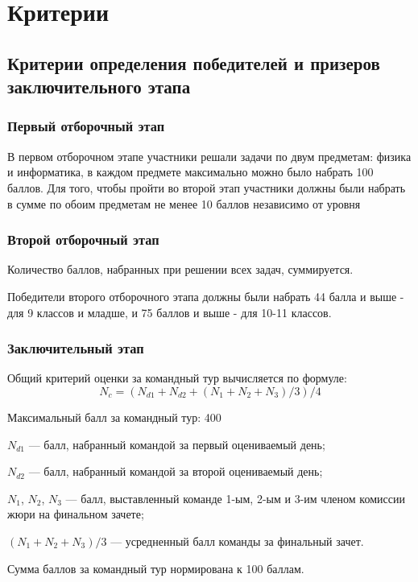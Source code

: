 \part{Критерии}

\chapter{Критерии определения победителей и призеров заключительного этапа}

\section{Первый отборочный этап}

В первом отборочном этапе участники решали задачи по двум предметам: физика и информатика, в каждом предмете максимально можно было набрать 100 баллов. Для того, чтобы пройти во второй этап участники  должны были набрать в сумме по обоим предметам не менее 10 баллов независимо от уровня

\section{Второй отборочный этап}

Количество баллов, набранных при решении всех задач, суммируется. 

Победители второго отборочного этапа должны были набрать 44 балла и выше - для 9 классов и младше, и 75 баллов и выше -  для 10-11 классов. 

\section{Заключительный этап}

Общий критерий оценки за командный тур вычисляется по формуле:
$$N_c = (N_{d1} + N_{d2} + (N_1 + N_2 + N_3)/3)/4$$

Максимальный балл за командный тур: 400

$N_{d1}$ — балл, набранный командой за первый оцениваемый день;

$N_{d2}$ — балл, набранный командой за второй оцениваемый день;

$N_1$, $N_2$, $N_3$ — балл, выставленный команде 1-ым, 2-ым и 3-им членом комиссии жюри на финальном зачете;

$(N_1 + N_2 + N_3)/3$ — усредненный балл команды за финальный зачет.

Сумма баллов за командный тур нормирована к 100 баллам.


